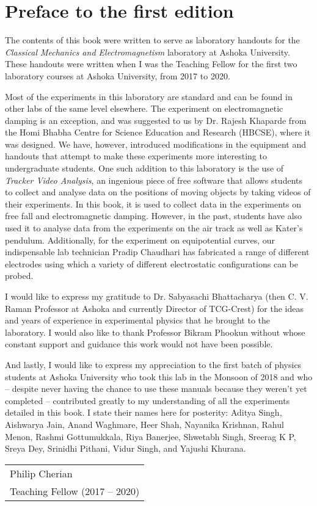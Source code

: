 \chapter*{Preface to the first edition}

The contents of this book were written to serve as laboratory handouts for the \textsl{Classical Mechanics and Electromagnetism} laboratory at Ashoka University. These handouts were written when I was the Teaching Fellow for the first two laboratory courses at Ashoka University, from 2017 to 2020. 

Most of the experiments in this laboratory are standard and can be found in other labs of the same level elsewhere. The experiment on electromagnetic damping is an exception, and was suggested to us by Dr. Rajesh Khaparde from the Homi Bhabha Centre for Science Education and Research (HBCSE), where it was designed. We have, however, introduced modifications in the equipment and handouts that attempt to make these experiments more interesting to undergraduate students. One such addition to this laboratory is the use of \textsl{Tracker Video Analysis}, an ingenious piece of free software that allows students to collect and analyse data on the positions of moving objects by taking videos of their experiments. In this book, it is used to collect data in the experiments on free fall and electromagnetic damping. However, in the past, students have also used it to analyse data from the experiments on the air track as well as Kater's pendulum. Additionally, for the experiment on equipotential curves, our indispensable lab technician Pradip Chaudhari has fabricated a range of different electrodes using which a variety of different electrostatic configurations can be probed. 

I would like to express my gratitude to Dr. Sabyasachi Bhattacharya (then C. V. Raman Professor at Ashoka and currently Director of TCG-Crest) for the ideas and years of experience in experimental physics that he brought to the laboratory. I would also like to thank Professor Bikram Phookun without whose constant support and guidance this work would not have been possible. 

And lastly, I would like to express my appreciation to the first batch of physics students at Ashoka University who took this lab in the Monsoon of 2018 and who -- despite never having the chance to use these manuals because they weren't yet completed -- contributed greatly to my understanding of all the experiments detailed in this book. I state their names here for posterity: Aditya Singh, Aishwarya Jain, Anand Waghmare, Heer Shah, Nayanika Krishnan, Rahul Menon, Rashmi Gottumukkala, Riya Banerjee, Shwetabh Singh, Sreerag K P, Sreya Dey, Srinidhi Pithani, Vidur Singh, and Yajushi Khurana.




\hfill
\begin{tabular}{@{}l@{}}
Philip Cherian\\
Teaching Fellow (2017 -- 2020)
\end{tabular}
